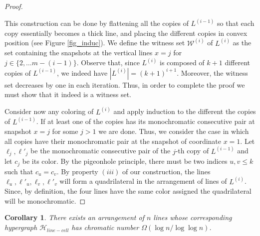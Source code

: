 \documentclass[11pt,a4paper]{article}
\newtheorem{corollary}[theorem]{Corollary}
\newcommand{\Hlinecell}{{\mathcal H}_{line-cell}}
\begin{document}
\begin{proof}
\begin{itemize}
\end{itemize}
This construction can be done by flattening all the copies of $L^{(i-1)}$ so that each copy essentially becomes a thick line, and placing the different copies in convex position (see Figure \ref{fig_induc}). We define the witness set $\mathcal{W}^{(i)}$ of $L^{(i)}$ as the set containing the snapshots at the vertical lines $x=j$ for $j\in \{2, \ldots m-(i-1)\}$. Observe that, since $L^{(i)}$ is composed of $k+1$ different copies of $L^{(i-1)}$, we indeed have $|L^{(i)}|=(k+1)^{i+1}$. Moreover, the witness set decreases by one in each iteration. Thus, in order to complete the proof we must show that it indeed is a witness set.

Consider now any coloring of $L^{(i)}$ and apply induction to the different the copies of $L^{(i-1)}$. If at least one of the copies has its monochromatic consecutive pair at snapshot $x=j$ for some $j>1$ we are done. Thus, we consider the case in which all copies have their monochromatic pair at the snapshot of coordinate $x=1$. Let $\ell_j,\ell'_j$ be the monochromatic consecutive pair of the $j$-th copy of $L^{(i-1)}$ and let $c_j$ be its color. By the pigeonhole principle, there must be two indices $u,v\leq k$ such that $c_u=c_v$. By property $(iii)$ of our construction, the lines $\ell_u,\ell'_u,\ell_v,\ell'_v $ will form a quadrilateral in the arrangement of lines of $L^{(i)}$. Since, by definition, the four lines have the same color assigned the quadrilateral will be monochromatic.
\end{proof}
\begin{corollary}
\label{UB:chrom}
There exists an arrangement of $n$ lines whose corresponding hypergraph $\Hlinecell$  has chromatic number $\Omega(\log n /\log \log n)$.
\end{corollary}
\fi
\end{document}

